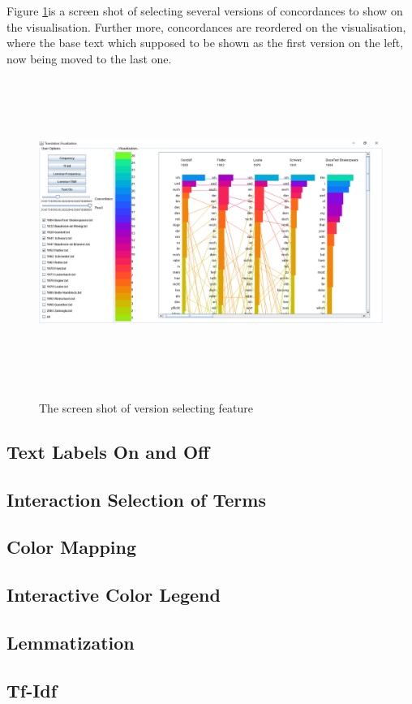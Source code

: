 Figure \ref{fig:versionChoosDemo}is a screen shot of selecting several versions of concordances to show on the visualisation. Further more, concordances are reordered on the visualisation, where the base text which supposed to be shown as the first version on the left, now being moved to the last one.

\begin{figure}[h]
	\centering	
	\includegraphics[width=18cm, height=10cm]{Figs/Version-Selecting-Demo}\\[1ex]
	\caption{The screen shot of version selecting feature}
	\label{fig:versionChoosDemo}
\end{figure} 




\subsection{Text Labels On and Off}

\subsection{Interaction Selection of Terms}

\subsection{Color Mapping}

\subsection{Interactive Color Legend}

\subsection{Lemmatization}

\subsection{Tf-Idf}

\subsection{}




